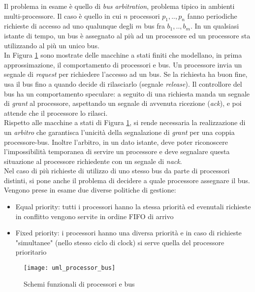 Il problema in esame è quello di \textit{bus arbitration}, problema tipico in ambienti multi-processore. Il caso è quello in cui $n$ processori ${p_1,..,p_n}$  fanno periodiche richieste di accesso ad uno qualunque degli $m$ bus fra ${b_1,..,b_m}$. In un qualsiasi istante di tempo, un bus è assegnato al più ad un processore ed un processore sta utilizzando al più un unico bus.\\
In Figura \ref{Fig:uml} sono mostrate delle macchine a stati finiti che modellano, in prima approssimazione, il comportamento di processori e bus. Un processore invia un segnale di \textit{request} per richiedere l'accesso ad un bus. Se la richiesta ha buon fine, usa il bus fino a quando decide di rilasciarlo (segnale \textit{release}). Il controllore del bus ha un comportamento speculare: a seguito di una richiesta manda un segnale di \textit{grant} al processore, aspettando un segnale di avvenuta ricezione (\textit{ack}), e poi attende che il processore lo rilasci.\\
Rispetto alle macchine a stati di Figura \ref{Fig:uml}, si rende necessaria la realizzazione di un \textit{arbitro} che garantisca l’unicità della segnalazione di \textit{grant} per una coppia processore-bus. Inoltre l’arbitro, in un dato istante, deve poter riconoscere l’impossibilità temporanea di servire un processore e deve segnalare questa situazione al processore richiedente con un segnale di \textit{nack}.\\
Nel caso di più richieste di utilizzo di uno stesso bus da parte di processori distinti, si pone anche il problema di decidere a quale processore assegnare il bus. Vengono prese in esame due diverse politiche di gestione:
\begin{itemize}
\item Equal priority:  tutti i processori hanno la stessa priorità ed evenutali richieste in conflitto vengono servite in ordine FIFO di arrivo
\item Fixed priority:  i processori hanno una diversa priorità e in caso di richieste "simultanee" (nello stesso ciclo di clock) si serve quella del processore prioritario
\end{itemize}

\begin{center}
\begin{figure}
\texttt{[image: uml\_processor\_bus]}
\caption{Schemi funzionali di processori e bus}
\label{Fig:uml}
\end{figure}
\end{center}